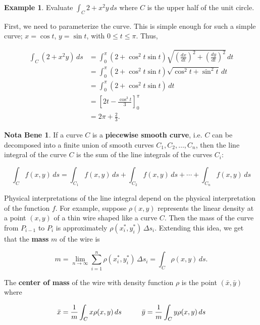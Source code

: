 \documentclass[11pt,oneside,english]{amsart}
\theoremstyle{definition}
\newtheorem*{example}{Example}
\newtheorem*{note}{Nota Bene}
\newcommand{\pspace}{\hspace{10mm}}
\newcommand{\lom}[2]{\lim_{{#1}\rightarrow{#2}}}
\newcommand{\dd}[2]{\frac{d{#1}}{d{#2}}}
\begin{document}
\begin{example}
Evaluate $\int_C2+x^2y\,ds$ where $C$ is the upper half of the unit circle.

First, we need to parameterize the curve. This is simple enough for such a simple curve; $x=\cos t$, $y=\sin t$, with $0\leq t \leq \pi$. Thus,

\begin{align*}
\int_C(2+x^2y)\,ds&=\int_0^\pi(2+\cos^2t\sin t)\sqrt{\left(\dd{x}{t}\right)^2+\left(\dd{y}{t}\right)^2}\,dt\\[2mm]
&=\int_0^\pi(2+\cos^2t\sin t)\sqrt{\cos^2t+\sin^2t}\,dt\\[2mm]
&=\int_0^\pi(2+\cos^2t\sin t)\,dt\\[2mm]
&=\left[2t-\frac{\cos^3t}{3}\right]_0^\pi\\[2mm]
&=2\pi+\frac{2}{3}.
\end{align*}
\end{example}

\vspace{7mm}
\begin{note}
If a curve $C$ is a \textbf{piecewise smooth curve}, i.e. $C$ can be decomposed into a finite union of smooth curves $C_1,C_2,\ldots,C_n$, then the line integral of the curve $C$ is the sum of the line integrals of the curves $C_i$:

\[
\int_Cf(x,y)\,ds=\int_{C_1}f(x,y)\,ds+\int_{C_2}f(x,y)\,ds+\cdots+\int_{C_n}f(x,y)\,ds
\]
\end{note}


Physical interpretations of the line integral depend on the physical interpretation of the function $f$. For example, suppose $\rho(x,y)$ represents the linear density at a point $(x,y)$ of a thin wire shaped like a curve $C$. Then the mass of the curve from $P_{i-1}$ to $P_i$ is approximately $\rho(x_i^*,y_i^*)\,\Delta s_i$. Extending this idea, we get that the \textbf{mass} $m$ of the wire is

\[
m=\lom{n}{\infty}\sum_{i=1}^n\rho(x_i^*,y_i^*)\,\Delta s_i=\int_C\rho(x,y)\,ds.
\]

\pagebreak

The \textbf{center of mass} of the wire with density function $\rho$ is the point $(\bar{x},\bar{y})$ where

\[
\bar{x}=\frac{1}{m}\int_Cx\rho(x,y)\,ds\pspace\bar{y}=\frac{1}{m}\int_Cy\rho(x,y)\,ds
\]
\end{document}

